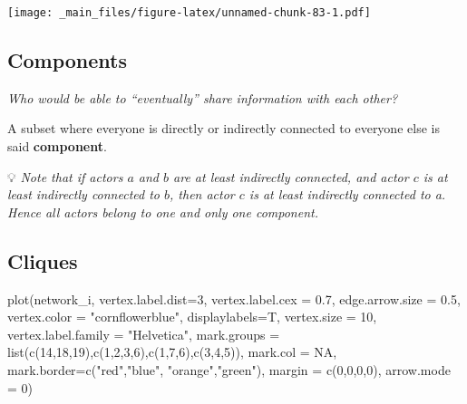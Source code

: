 \documentclass[
  notitlepage,
  onecolumn,
  openany]{book}
\newenvironment{Shaded}{\begin{snugshade}}{\end{snugshade}}
\newcommand{\AttributeTok}[1]{\textcolor[rgb]{0.77,0.63,0.00}{#1}}
\newcommand{\ConstantTok}[1]{\textcolor[rgb]{0.00,0.00,0.00}{#1}}
\newcommand{\DecValTok}[1]{\textcolor[rgb]{0.00,0.00,0.81}{#1}}
\newcommand{\FloatTok}[1]{\textcolor[rgb]{0.00,0.00,0.81}{#1}}
\newcommand{\FunctionTok}[1]{\textcolor[rgb]{0.00,0.00,0.00}{#1}}
\newcommand{\NormalTok}[1]{#1}
\newcommand{\StringTok}[1]{\textcolor[rgb]{0.31,0.60,0.02}{#1}}
\begin{document}
\texttt{[image: \_main\_files/figure-latex/unnamed-chunk-83-1.pdf]}

\hypertarget{components-1}{%
\subsection{Components}\label{components-1}}

\emph{Who would be able to ``eventually'' share information with each other?}

A subset where everyone is directly or indirectly connected to everyone else is said \textbf{component}.

💡 \emph{Note that if actors \(a\) and \(b\) are at least indirectly connected, and actor \(c\) is at least indirectly connected to \(b\), then actor \(c\) is at least indirectly connected to a. Hence all actors belong to one and only one component.}

\hypertarget{cliques}{%
\subsection{Cliques}\label{cliques}}

\begin{Shaded}
\begin{Highlighting}[]
\FunctionTok{plot}\NormalTok{(network\_i,}
     \AttributeTok{vertex.label.dist=}\DecValTok{3}\NormalTok{,}
     \AttributeTok{vertex.label.cex =} \FloatTok{0.7}\NormalTok{,}
     \AttributeTok{edge.arrow.size =} \FloatTok{0.5}\NormalTok{,}
     \AttributeTok{vertex.color =} \StringTok{"cornflowerblue"}\NormalTok{,}
     \AttributeTok{displaylabels=}\NormalTok{T,}
     \AttributeTok{vertex.size =} \DecValTok{10}\NormalTok{,}
     \AttributeTok{vertex.label.family =} \StringTok{"Helvetica"}\NormalTok{,}
     \AttributeTok{mark.groups =} \FunctionTok{list}\NormalTok{(}\FunctionTok{c}\NormalTok{(}\DecValTok{14}\NormalTok{,}\DecValTok{18}\NormalTok{,}\DecValTok{19}\NormalTok{),}\FunctionTok{c}\NormalTok{(}\DecValTok{1}\NormalTok{,}\DecValTok{2}\NormalTok{,}\DecValTok{3}\NormalTok{,}\DecValTok{6}\NormalTok{),}\FunctionTok{c}\NormalTok{(}\DecValTok{1}\NormalTok{,}\DecValTok{7}\NormalTok{,}\DecValTok{6}\NormalTok{),}\FunctionTok{c}\NormalTok{(}\DecValTok{3}\NormalTok{,}\DecValTok{4}\NormalTok{,}\DecValTok{5}\NormalTok{)),}
     \AttributeTok{mark.col =} \ConstantTok{NA}\NormalTok{,}
     \AttributeTok{mark.border=}\FunctionTok{c}\NormalTok{(}\StringTok{"red"}\NormalTok{,}\StringTok{"blue"}\NormalTok{, }\StringTok{"orange"}\NormalTok{,}\StringTok{"green"}\NormalTok{),}
     \AttributeTok{margin =} \FunctionTok{c}\NormalTok{(}\DecValTok{0}\NormalTok{,}\DecValTok{0}\NormalTok{,}\DecValTok{0}\NormalTok{,}\DecValTok{0}\NormalTok{),}
     \AttributeTok{arrow.mode =} \DecValTok{0}\NormalTok{)}
\end{Highlighting}
\end{Shaded}
\end{document}
